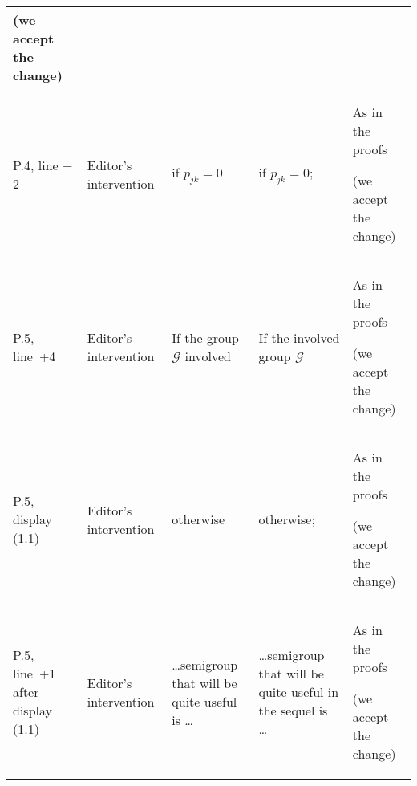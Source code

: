 \documentclass[11pt]{article}
\begin{document}
\begin{tabular}{|p{2.2cm}|p{1.8cm}|p{4.2cm}|p{4.2cm}|p{4.2cm}|}
(we accept the change)\\
\hline
P.4, line $-$2 & Editor's intervention & if $p_{jk}=0$\red{,} & if $p_{jk}=0$;
& As in the proofs

(we accept the change)\\
\hline
P.5, line~+4 & Editor's intervention & If the group $\mathcal G$ involved &
If the involved group $\mathcal G$ & As in the proofs

(we accept the change)\\
\hline
P.5, display (1.1) & Editor's intervention & otherwise\red{,} & otherwise; & As in the proofs

(we accept the change)\\
\hline
P.5, line~+1 after display (1.1) & Editor's intervention & \dots semigroup that will be quite useful is \dots &
\dots semigroup that will be quite useful in the sequel is \dots & As in the proofs

(we accept the change)\\
\hline
\end{tabular}
\end{document}
